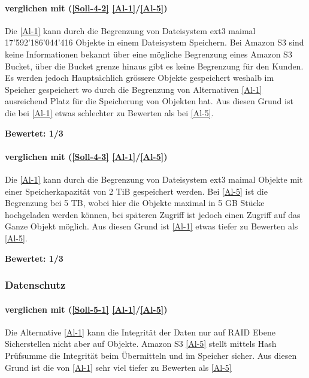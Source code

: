 \paragraph*{  verglichen mit  (\ref{Soll-4-2} \ref{Al-1}/\ref{Al-5})} 
Die \ref{Al-1} kann durch die Begrenzung von Dateisystem ext3 maimal 17'592'186'044'416 Objekte in einem Dateisystem Speichern. Bei Amazon S3 sind keine Informationen bekannt über eine mögliche Begrenzung eines Amazon S3 Bucket, über die Bucket grenze hinaus gibt es keine Begrenzung für den Kunden. Es werden jedoch Hauptsächlich grössere Objekte gespeichert weshalb im Speicher gespeichert wo durch die Begrenzung von Alternativen \ref{Al-1} ausreichend Platz für die Speicherung von Objekten hat. Aus diesen Grund ist die  bei \ref{Al-1} etwas schlechter zu Bewerten als bei \ref{Al-5}.

\textbf{Bewertet: 1/3}

\paragraph*{  verglichen mit  (\ref{Soll-4-3} \ref{Al-1}/\ref{Al-5})} 
Die \ref{Al-1} kann durch die Begrenzung von Dateisystem ext3 maimal Objekte mit einer Speicherkapazität von 2 TiB gespeichert werden. Bei \ref{Al-5} ist die Begrenzung bei 5 TB, wobei hier die Objekte maximal in 5 GB Stücke hochgeladen werden können, bei späteren Zugriff ist jedoch einen Zugriff auf das Ganze Objekt möglich. Aus diesen Grund ist \ref{Al-1} etwas tiefer zu Bewerten als \ref{Al-5}.

\textbf{Bewertet: 1/3}

\subsubsection{Datenschutz}

\paragraph*{  verglichen mit  (\ref{Soll-5-1} \ref{Al-1}/\ref{Al-5})} 
Die Alternative \ref{Al-1} kann die Integrität der Daten nur auf RAID Ebene Sicherstellen nicht aber auf Objekte. Amazon S3 \ref{Al-5} stellt mittels Hash Prüfsumme die Integrität beim Übermitteln und im Speicher sicher. Aus diesen Grund ist die  von \ref{Al-1} sehr viel tiefer zu Bewerten als \ref{Al-5}

